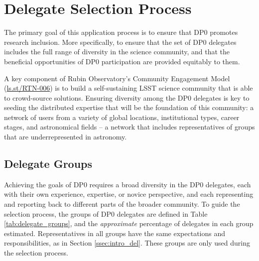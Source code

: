 \documentclass[DM,lsstdraft,authoryear,toc]{lsstdoc}
\begin{document}
\section{Delegate Selection Process}\label{sec:sel}

The primary goal of this application process is to ensure that DP0 promotes research inclusion.
More specifically, to ensure that the set of DP0 delegates includes the full range of diversity in the science community, and that the beneficial opportunities of DP0 participation are provided equitably to them.

A key component of Rubin Observatory's Community Engagement Model (\url{ls.st/RTN-006}) is to build a self-sustaining LSST science community that is able to crowd-source solutions. 
Ensuring diversity among the DP0 delegates is key to seeding the distributed expertise that will be the foundation of this community: a network of users from a variety of global locations, institutional types, career stages, and astronomical fields -- a network that includes representatives of groups that are underrepresented in astronomy.


\subsection{Delegate Groups}\label{ssec:sel_grps}

Achieving the goals of DP0 requires a broad diversity in the DP0 delegates, each with their own experience, expertise, or novice perspective, and each representing and reporting back to different parts of the broader community.
To guide the selection process, the groups of DP0 delegates are defined in Table \ref{tab:delegate_groups}, and the \emph{approximate} percentage of delegates in each group estimated.
Representatives in all groups have the same expectations and responsibilities, as in Section \ref{ssec:intro_del}.
These groups are only used during the selection process.
\end{document}
